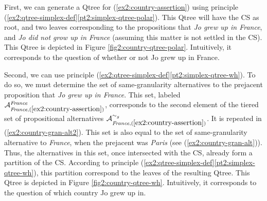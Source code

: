 \begin{exe}
	\label{ex2:country-tiered-alt}
\end{exe} 


First, we can generate a Qtree for (\ref{ex2:country-assertion}) using principle (\ref{ex2:qtree-simplex-def}\ref{pt2:simplex-qtree-polar}). This Qtree will have the CS as root, and two leaves corresponding to the propositions that \textit{Jo grew up in France}, and \textit{Jo did not grow up in France} (assuming this matter is not settled in the CS). This Qtree is depicted in Figure \ref{fig2:country-qtree-polar}. Intuitively, it corresponds to the question of whether or not Jo grew up in France.

Second, we can use principle (\ref{ex2:qtree-simplex-def}\ref{pt2:simplex-qtree-wh}). To do so, we must determine the set of same-granularity alternatives to the prejacent proposition that \textit{Jo grew up in France}. This set, labeled $\mathcal{A}_{\textit{France}, (\ref{ex2:country-assertion})}^{\textit{France}}$, corresponds to the second element of the tiered set of propositional alternatives $\mathcal{A}_{\textit{France}, (\ref{ex2:country-assertion})}^{\sim_g}$. It is repeated in (\ref{ex2:country-gran-alt2}). This set is also equal to the set of same-granularity alternative to \textit{France}, when the prejacent was \textit{Paris} (see (\ref{ex2:country-gran-alt})). Thus, the alternatives in this set, once intersected with the CS, already form a partition of the CS. According to principle (\ref{ex2:qtree-simplex-def}\ref{pt2:simplex-qtree-wh}), this partition correspond to the leaves of the resulting Qtree. This Qtree is depicted in Figure \ref{fig2:country-qtree-wh}. Intuitively, it corresponds to the question of which country Jo grew up in.


